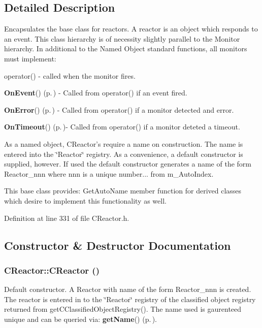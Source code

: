 \subsection{Detailed Description}
Encapsulates the base class for reactors. A reactor is an object which responds to an  event. This class hierarchy is of necessity slightly parallel to the Monitor hierarchy. In additional to the Named Object standard functions, all monitors must implement:\begin{CompactItemize}
\item 
operator() - called when the monitor fires.\end{CompactItemize}
\begin{CompactItemize}
\item 
{\bf On\-Event}() {\rm (p.\,\pageref{classCReactor_a6})} - Called from operator() if an event fired.\item 
{\bf On\-Error}() {\rm (p.\,\pageref{classCReactor_a7})} - Called from operator() if a monitor detected and error.\item 
{\bf On\-Timeout}() {\rm (p.\,\pageref{classCReactor_a8})}- Called from operator() if a monitor deteted a timeout.\end{CompactItemize}
As a named object, CReactor's require a name on construction. The name is entered into the \char`\"{}Reactor\char`\"{} registry. As a convenience, a default  constructor is supplied, however. If used the default constructor generates a name of the form Reactor\_\-nnn where nnn is a unique number... from m\_\-Auto\-Index.

This base class provides: Get\-Auto\-Name member function for derived classes which desire to implement this functionality as well. 



Definition at line 331 of file CReactor.h.

\subsection{Constructor \& Destructor Documentation}
\subsubsection{\setlength{\rightskip}{0pt plus 5cm}CReactor::CReactor ()}\label{classCReactor_a0}


Default constructor. A Reactor with name of the form Reactor\_\-nnn is created. The reactor is entered in to the \char`\"{}Reactor\char`\"{} registry of the  classified object registry returned from get\-CClassified\-Object\-Registry(). The name used is gaurenteed unique and can be queried via: {\bf get\-Name}() {\rm (p.\,\pageref{classCNamedObject_a6})}. 

